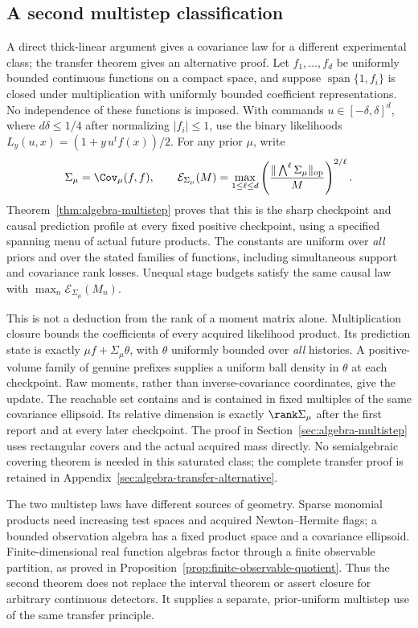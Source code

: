 \subsection{A second multistep classification}
A direct thick-linear argument gives a covariance law for a different
experimental class; the transfer theorem gives an alternative proof. Let $f_1,\ldots,f_d$ be uniformly bounded continuous
functions on a compact space, and suppose $\operatorname{span}\{1,f_i\}$
is closed under multiplication with uniformly bounded coefficient
representations. No independence of these functions is imposed. With
commands $u\in[-\delta,\delta]^d$, where $d\delta\le1/4$ after
normalizing $|f_i|\le1$, use the binary likelihoods
$L_y(u,x)=(1+y\,u^tf(x))/2$. For any prior $\mu$, write
\[
 \Sigma_\mu=\Cov_\mu(f,f),\qquad
 \mathcal E_{\Sigma_\mu}(M)=
 \max_{1\le\ell\le d}
 \left(\frac{\|\bigwedge^\ell\Sigma_\mu\|_{\rm op}}{M}\right)^{2/\ell}.
\]
Theorem~\ref{thm:algebra-multistep} proves that this is the sharp
checkpoint and causal prediction profile at every fixed positive
checkpoint, using a specified spanning menu of actual future products.
The constants are uniform over \emph{all} priors and over the stated
families of functions, including simultaneous support and covariance
rank losses. Unequal stage budgets satisfy the same causal law with
$\max_n\mathcal E_{\Sigma_\mu}(M_n)$.

This is not a deduction from the rank of a moment matrix alone.
Multiplication closure bounds the coefficients of every acquired
likelihood product. Its prediction state is exactly
$\mu f+\Sigma_\mu\theta$, with $\theta$ uniformly bounded over
\emph{all} histories. A positive-volume family of genuine prefixes
supplies a uniform ball density in $\theta$ at each checkpoint.
Raw moments, rather than inverse-covariance coordinates, give the
update. The reachable set contains and is contained in fixed multiples of the
same covariance ellipsoid. Its relative dimension is exactly
$\rank\Sigma_\mu$ after the first report and at every later checkpoint.
The proof in Section~\ref{sec:algebra-multistep} uses rectangular covers
and the actual acquired mass directly. No semialgebraic covering theorem
is needed in this saturated class; the complete transfer proof is retained
in Appendix~\ref{sec:algebra-transfer-alternative}.

The two multistep laws have different sources of geometry. Sparse
monomial products need increasing test spaces and acquired
Newton--Hermite flags; a bounded observation algebra has a fixed
product space and a covariance ellipsoid. Finite-dimensional real
function algebras factor through a finite observable partition, as
proved in Proposition~\ref{prop:finite-observable-quotient}. Thus the
second theorem does not replace the interval theorem or assert closure
for arbitrary continuous detectors. It supplies a separate,
prior-uniform multistep use of the same transfer principle.


